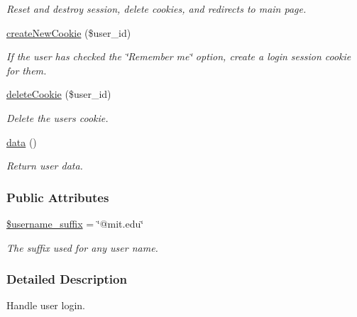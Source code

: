 \begin{DoxyCompactItemize}
\begin{DoxyCompactList}\small\item\em Reset and destroy session, delete cookies, and redirects to main page. \end{DoxyCompactList}\item 
\hyperlink{classMember_aec76f4eeb51b0a6678305e71ca90f9d4}{create\-New\-Cookie} (\$user\-\_\-id)
\begin{DoxyCompactList}\small\item\em If the user has checked the \char`\"{}\-Remember me\char`\"{} option, create a login session cookie for them. \end{DoxyCompactList}\item 
\hyperlink{classMember_ac2dcb4c19a67fe43eb5806105401bfed}{delete\-Cookie} (\$user\-\_\-id)
\begin{DoxyCompactList}\small\item\em Delete the users cookie. \end{DoxyCompactList}\item 
\hypertarget{classMember_a9efd5a33fc7ecde58c4869061ab4e3df}{\hyperlink{classMember_a9efd5a33fc7ecde58c4869061ab4e3df}{data} ()}\label{classMember_a9efd5a33fc7ecde58c4869061ab4e3df}

\begin{DoxyCompactList}\small\item\em Return user data. \end{DoxyCompactList}\end{DoxyCompactItemize}
\subsubsection*{Public Attributes}
\begin{DoxyCompactItemize}
\item 
\hypertarget{classMember_ad34ad36031d144cb0b1fe6020bfcaf4b}{\hyperlink{classMember_ad34ad36031d144cb0b1fe6020bfcaf4b}{\$username\-\_\-suffix} = \char`\"{}@mit.\-edu\char`\"{}}\label{classMember_ad34ad36031d144cb0b1fe6020bfcaf4b}

\begin{DoxyCompactList}\small\item\em The suffix used for any user name. \end{DoxyCompactList}\end{DoxyCompactItemize}


\subsubsection{Detailed Description}
Handle user login. 

